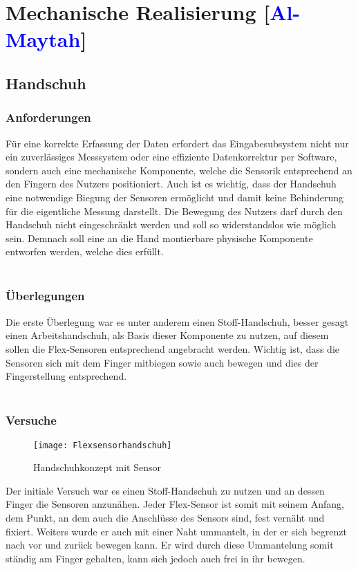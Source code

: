 \documentclass[titlepage,12pt,twoside]{article}
\begin{document}
\newpage
\section{Mechanische Realisierung [\textcolor{blue}{Al-Maytah}]}
\label{chap:Mechanische Realisierung}

\subsection{Handschuh}
\subsubsection{Anforderungen}
Für eine korrekte Erfassung der Daten erfordert das Eingabesubsystem nicht nur ein 
zuverlässiges Messsystem oder eine effiziente Datenkorrektur per Software, 
sondern auch eine mechanische Komponente, welche die Sensorik entsprechend an den 
Fingern des Nutzers positioniert. Auch ist es wichtig, dass der Handschuh eine notwendige Biegung der Sensoren ermöglicht und damit keine Behinderung für die eigentliche Messung darstellt.
Die Bewegung des Nutzers darf durch den Handschuh nicht eingeschränkt werden und soll so widerstandslos wie möglich sein.
Demnach soll eine an die Hand montierbare physische 
Komponente entworfen werden, welche dies erfüllt.
\\
\\
\subsubsection{Überlegungen}
Die erste Überlegung war es unter anderem einen Stoff-Handschuh, besser gesagt einen 
Arbeitshandschuh, als Basis dieser Komponente zu nutzen, auf diesem sollen die 
Flex-Sensoren entsprechend angebracht werden. Wichtig ist, dass die Sensoren sich 
mit dem Finger mitbiegen sowie auch bewegen und dies der Fingerstellung entsprechend. \\
\\
\subsubsection{Versuche}
\begin{figure}[H]
	\begin{center}
		\scalebox{0.5}
		{\texttt{[image: Flexsensorhandschuh]}}
		\caption{Handschuhkonzept mit Sensor}
		\label{fig:Flexsensorhandschuh}		
	\end{center}
\end{figure}
\hfill \break
Der initiale Versuch war es einen Stoff-Handschuh zu nutzen und an dessen Finger die Sensoren anzunähen. Jeder Flex-Sensor ist somit mit seinem Anfang, dem 
Punkt, an dem auch die Anschlüsse des Sensors sind, fest vernäht und fixiert. Weiters 
wurde er auch mit einer Naht ummantelt, in der er sich begrenzt nach vor und zurück 
bewegen kann. Er wird durch diese Ummantelung somit ständig am Finger gehalten, kann 
sich jedoch auch frei in ihr bewegen. \\
\\
\end{document}
